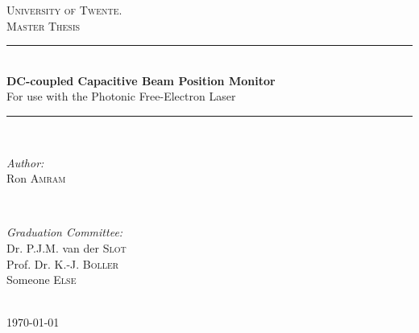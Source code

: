 \documentclass[12pt,a4paper]{report} %
\begin{document}


\begin{titlepage}

\newcommand{\HRule}{\rule{\linewidth}{0.5mm}} %

\center %

\textsc{\LARGE University of Twente.}\\[1.5cm] %
\textsc{\Large Master Thesis}\\[0.5cm] %

\HRule \\[0.4cm]
{ \huge \bfseries DC-coupled Capacitive Beam Position Monitor}\\[0.4cm] %
{\Large For use with the Photonic Free-Electron Laser}
\HRule \\[1.5cm]

\begin{minipage}{0.4\textwidth}
\begin{flushleft} \large
\emph{Author:}\\
Ron \textsc{Amram} %
\end{flushleft}
\end{minipage}
~
\begin{minipage}{0.4\textwidth}
\begin{flushright} \large
\emph{Graduation Committee:} \\
Dr. P.J.M. van der  \textsc{Slot} \\
Prof. Dr. K.-J. \textsc{Boller} \\
Someone \textsc{Else}
\end{flushright}
\end{minipage}\\[4cm]

{\large \today}\\[3cm] %


\vfill %

\end{titlepage}
\end{document}
